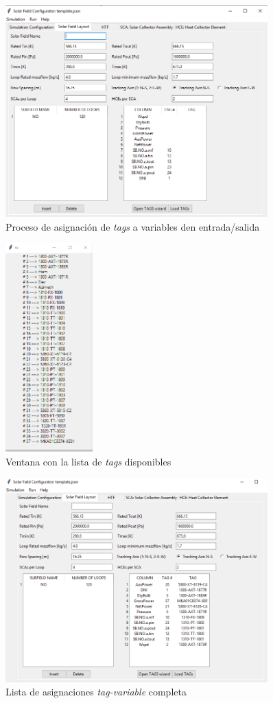 \begin{figure}[H]
\includegraphics[width=0.9\textwidth, height=0.7\textwidth]{images/carga_tags.png}
\caption{Proceso de asignación de \emph{tags} a variables den entrada/salida}
\label{fig:carga1}
\end{figure}

\begin{figure}[H]
\includegraphics[width=0.3\textwidth, height=0.5\textwidth]{images/tagslist.png}
\caption{Ventana con la lista de \emph{tags} disponibles}
\label{fig:listatags}
\end{figure}

\begin{figure}[H]
\includegraphics[width=0.9\textwidth, height=0.7\textwidth]{images/tagscargados.png}
\caption{Lista de asignaciones \emph{tag-variable} completa}
\label{fig:carga2}
\end{figure}


